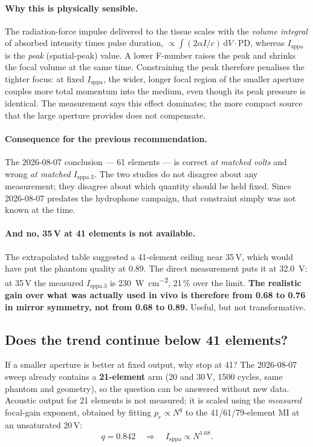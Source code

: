 \documentclass[11pt,a4paper]{article}
\newcommand{\caveat}[1]{\textcolor{orange!75!black}{\textbf{#1}}}
\begin{document}
\paragraph{Why this is physically sensible.} The radiation-force impulse delivered to the tissue scales
with the \emph{volume integral} of absorbed intensity times pulse duration, $\propto \int (2\alpha
I/c)\,\mathrm{d}V \cdot \mathrm{PD}$, whereas $I_\mathrm{sppa}$ is the \emph{peak} (spatial-peak) value.
A lower F-number raises the peak and shrinks the focal volume at the same time. Constraining the peak
therefore penalises the tighter focus: at fixed $I_\mathrm{sppa}$, the wider, longer focal region of the
smaller aperture couples more total momentum into the medium, even though its peak pressure is
identical. The measurement says this effect dominates; the more compact source that the large aperture
provides does not compensate.

\paragraph{Consequence for the previous recommendation.} The 2026-08-07 conclusion --- 61 elements ---
is correct \emph{at matched volts} and wrong \emph{at matched $I_\mathrm{sppa.3}$}. The two studies do
not disagree about any measurement; they disagree about which quantity should be held fixed. Since
2026-08-07 predates the hydrophone campaign, that constraint simply was not known at the time.

\paragraph{And no, 35\,V at 41 elements is not available.} The extrapolated table suggested a
41-element ceiling near 35\,V, which would have put the phantom quality at 0.89. The direct
measurement puts it at \SI{32.0}{\volt}: at 35\,V the measured $I_\mathrm{sppa.3}$ is
\SI{230}{\watt\per\square\centi\metre}, 21\,\% over the limit. \caveat{The realistic gain over what
was actually used in vivo is therefore from 0.68 to 0.76 in mirror symmetry, not from 0.68 to
0.89.} Useful, but not transformative.

\subsection{Does the trend continue below 41 elements?}\label{sec:trend}
If a smaller aperture is better at fixed output, why stop at 41? The 2026-08-07 sweep already
contains a \textbf{21-element} arm (20 and 30\,V, 1500 cycles, same phantom and geometry), so the
question can be answered without new data. Acoustic output for 21 elements is not measured; it is
scaled using the \emph{measured} focal-gain exponent, obtained by fitting $p_r\propto N^q$ to the
41/61/79-element MI at an unsaturated 20\,V:
\begin{equation}
q = 0.842 \quad\Longrightarrow\quad I_\mathrm{sppa}\propto N^{1.68}.
\end{equation}
\end{document}
